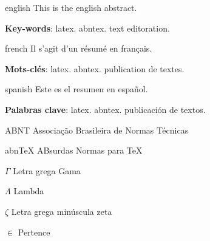 \documentclass[
    12pt,				%
    openright,			%
    twoside,			%
    a4paper,			%
    english,			%
    french,				%
    spanish,			%
    brazil				%
    ]{abntex2}
\begin{document}
\begin{resumo}[Abstract]
 \begin{otherlanguage*}{english}
   This is the english abstract.

   \vspace{\onelineskip}
 
   \noindent 
   \textbf{Key-words}: latex. abntex. text editoration.
 \end{otherlanguage*}
\end{resumo}

\begin{resumo}[Résumé]
 \begin{otherlanguage*}{french}
    Il s'agit d'un résumé en français.
 
   \textbf{Mots-clés}: latex. abntex. publication de textes.
 \end{otherlanguage*}
\end{resumo}

\begin{resumo}[Resumen]
 \begin{otherlanguage*}{spanish}
   Este es el resumen en español.
  
   \textbf{Palabras clave}: latex. abntex. publicación de textos.
 \end{otherlanguage*}
\end{resumo}

\listoffigures*
\cleardoublepage

\listoftables*
\cleardoublepage

\begin{siglas}
  \item[ABNT] Associação Brasileira de Normas Técnicas
  \item[abnTeX] ABsurdas Normas para TeX
\end{siglas}

\begin{simbolos}
  \item[$ \Gamma $] Letra grega Gama
  \item[$ \Lambda $] Lambda
  \item[$ \zeta $] Letra grega minúscula zeta
  \item[$ \in $] Pertence
\end{simbolos}
\end{document}
